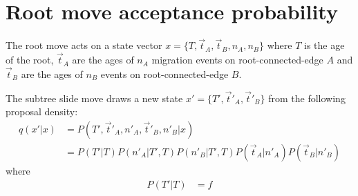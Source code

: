 \documentclass[a4paper, 11pt]{article}
\begin{document}
\section{Root move acceptance probability}

The root move acts on a state vector $x=\{T,\vec{t}_A,\vec{t}_B,n_A,n_B\}$
where $T$ is the age of the root, $\vec{t}_A$ are the ages of
$n_A$ migration events on root-connected-edge $A$ and $\vec{t}_B$ are the
ages of $n_B$ events on root-connected-edge $B$.

The subtree slide move draws a new state $x'=\{T',\vec{t}'_A,\vec{t}'_B\}$
from the following proposal density:
\begin{align}
  q(x'|x) &= P(T',\vec{t}'_A,n'_A,\vec{t}'_B,n'_B|x) \nonumber \\
& = P(T'|T)P(n'_A|T',T)P(n'_B|T',T)P(\vec{t}_A|n'_A)P(\vec{t}_B|n'_B)
\end{align}
where
\begin{align}
  P(T'|T) &= f
\end{align}
\end{document}
